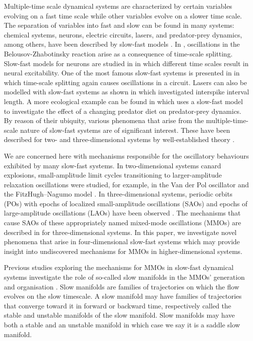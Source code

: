 \documentclass{ws-ijbc}
\begin{document}
Multiple-time scale dynamical systems are characterized by certain variables evolving on a fast time scale while other variables evolve on a slower time scale.  The separation of variables into fast and slow can be found in many systems: chemical systems, neurons, electric circuits, lasers, and predator-prey dynamics, among others, have been described by slow-fast models  \cite{BZ_reaction, Neurons, Circuits, lasers, Predator-Prey}.  In \cite{BZ_reaction}, oscillations in the Belousov-Zhabotinsky reaction arise as a consequence of time-scale splitting.  Slow-fast models for neurons are studied in \cite{Neurons} in which different time scales result in neural excitability.  One of the most famous slow-fast systems is presented in \cite{Circuits} in which time-scale splitting again causes oscillations in a circuit.  Lasers can also be modelled with slow-fast systems as shown in \cite{lasers} which investigated interspike interval length.  A more ecological example can be found in \cite{Predator-Prey} which uses a slow-fast model to investigate the effect of a changing predator diet on predator-prey dynamics.  By reason of their ubiquity, various phenomena that arise from the multiple-time-scale nature of slow-fast systems are of significant interest. These have been described for two- and three-dimensional systems by well-established theory \cite{canard_explosion, lents-rapides, enlacement,singular_hopf, folded_node,three}.

We are concerned here with mechanisms responsible for the oscillatory behaviours exhibited by many slow-fast systems.  In two-dimensional systems canard explosions, small-amplitude limit cycles transitioning to larger-amplitude relaxation oscillations were studied, for example, in the Van der Pol oscillator and the FitzHugh--Nagumo model \cite{canard_explosion, fitz-hugh-nagumo}.  In three-dimensional systems, periodic orbits (POs) with epochs of localized small-amplitude oscillations (SAOs) and epochs of large-amplitude oscillations (LAOs) have been observed \cite{BZ}.  The mechanisms that cause SAOs of these appropriately named mixed-mode oscillations (MMOs) are described in \cite{MMO} for three-dimensional systems.  In this paper, we investigate novel phenomena that arise in four-dimensional slow-fast systems which may provide insight into undiscovered mechanisms for MMOs in higher-dimensional systems.

Previous studies exploring the mechanisms for MMOs in slow-fast dynamical systems investigate the role of so-called slow manifolds in the MMOs' generation and organisation \cite{Vo_paper, Vo_paper2, Emily_Harvey_paper, Martin_neuron_paper, Cris_paper}.  Slow manifolds are families of trajectories on which the flow evolves on the slow timescale.  A slow manifold may have families of trajectories that converge toward it in forward or backward time, respectively called the stable and unstable manifolds of the slow manifold.  Slow manifolds may have both a stable and an unstable manifold in which case we say it is a saddle slow manifold.  
\end{document}
